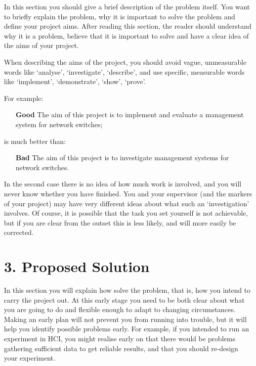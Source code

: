 \documentclass[11pt, a4paper, twoside, openright]{report}
\begin{document}
In this section you should give a brief description of the problem
itself. You want to briefly explain the problem, why it is important
to solve the problem and define your project aims. After reading this
section, the reader should understand why it is a problem, believe
that it is important to solve and have a clear idea of the aims of
your project.

When describing the aims of the project, you should avoid vague,
unmeasurable words like `analyse', `investigate', `describe', and use
specific, measurable words like `implement', `demonstrate', `show',
`prove'.

For example:

\begin{itemize}
  \item[\bf Good] The aim of this project is to implement and evaluate a
        management system for network switches;
\end{itemize}
is much better than:
\begin{itemize}
  \item[\bf Bad] The aim of this project is to investigate management
        systems for network switches.
\end{itemize}

In the second case there is no idea of how much work is involved, and
you will never know whether you have finished. You and your supervisor
(and the markers of your project) may have very different ideas about
what such an `investigation' involves. Of course, it is possible that
the task you set yourself is not achievable, but if you are clear from
the outset this is less likely, and will more easily be corrected.

\section*{3. Proposed Solution}

In this section you will explain how solve the problem, that is, how
you intend to carry the project out. At this early stage you need to
be both clear about what you are going to do and flexible enough to
adapt to changing circumstances. Making an early plan will not prevent
you from running into trouble, but it will help you identify possible
problems early. For example, if you intended to run an experiment in
HCI, you might realise early on that there would be problems gathering
sufficient data to get reliable results, and that you should re-design
your experiment.
\end{document}
